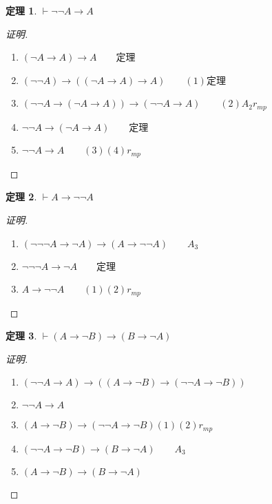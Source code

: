 \documentclass{article}
\newtheorem{Thm}{定理}
\begin{document}
\begin{CJK*}{UTF8}{gbsn}
  \begin{Thm}$\vdash \lnot\lnot A\to A$\end{Thm}
  \begin{proof}[证明]$\quad$
    \begin{enumerate}
      \item $(\lnot A\to A)\to A\qquad$定理
      \item $(\lnot \lnot A)\to ((\lnot A\to A)\to A)\qquad(1)$定理
      \item $(\lnot \lnot A\to (\lnot A\to A))\to (\lnot \lnot A\to A)\qquad (2)A_2r_{mp}$
      \item $\lnot \lnot A\to (\lnot A\to A)\qquad$定理
      \item $\lnot\lnot A\to A\qquad (3)(4)r_{mp}$
    \end{enumerate}
  \end{proof}

  \begin{Thm}$\vdash A\to \lnot\lnot A$\end{Thm}
  \begin{proof}[证明]$\quad$
    \begin{enumerate}
      \item $(\lnot\lnot\lnot A \to \lnot A)\to (A\to \lnot\lnot A)\qquad A_3$
      \item $\lnot\lnot\lnot A \to \lnot A\qquad$定理
      \item $A\to \lnot\lnot A\qquad (1)(2)r_{mp}$
    \end{enumerate}
  \end{proof}

  \begin{Thm}$\vdash (A\to \lnot B)\to (B\to \lnot A)$\end{Thm}
  \begin{proof}[证明]$\quad$
    \begin{enumerate}
      \item $(\lnot \lnot A \to A)\to ((A\to \lnot B)\to (\lnot\lnot A\to \lnot B))$
      \item $\lnot \lnot A \to A$
      \item $(A\to \lnot B)\to (\lnot\lnot A\to \lnot B) (1)(2)r_{mp}$
      \item $(\lnot\lnot A\to \lnot B)\to (B\to \lnot A)\qquad A_3$
      \item $(A\to \lnot B)\to (B\to \lnot A)$
    \end{enumerate}
  \end{proof}


\end{CJK*}
\end{document}
